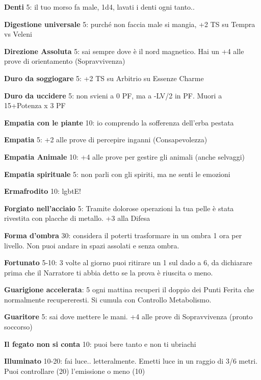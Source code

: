 \documentclass[a4paper,11pt,twoside,openany]{book}
\begin{document}
\textbf{Denti} 5: il tuo morso fa male, 1d4, lavati i denti ogni tanto..

\textbf{Digestione universale} 5: purché non faccia male si mangia, +2 TS su Tempra vs Veleni

\textbf{Direzione Assoluta} 5: sai sempre dove è il nord magnetico. Hai un +4 alle prove di orientamento (Sopravvivenza)

\textbf{Duro da soggiogare} 5: +2 TS su Arbitrio su Essenze Charme

\textbf{Duro da uccidere} 5: non svieni a 0 PF, ma a -LV/2 in PF. Muori a 15+Potenza x 3 PF

\textbf{Empatia con le piante} 10: io comprendo la sofferenza dell'erba pestata

\textbf{Empatia} 5: +2 alle prove di percepire inganni (Consapevolezza)

\textbf{Empatia Animale} 10: +4 alle prove per gestire gli animali (anche selvaggi)

\textbf{Empatia spirituale} 5: non parli con gli spiriti, ma ne senti le emozioni

\textbf{Ermafrodito} 10: lgbtE!

\textbf{Forgiato nell'acciaio} 5: Tramite dolorose operazioni la tua pelle è stata rivestita con placche di metallo. +3 alla Difesa

\textbf{Forma d'ombra} 30: considera il poterti trasformare in un ombra 1 ora per livello. Non puoi andare in spazi assolati e senza ombra.

\textbf{Fortunato} 5-10: 3 volte al giorno puoi ritirare un 1 sul dado a 6, da dichiarare prima che il Narratore ti abbia detto se la prova è riuscita o meno.

\textbf{Guarigione accelerata}: 5 ogni mattina recuperi il doppio dei Punti Ferita che normalmente recupereresti. Si cumula con Controllo Metabolismo. 

\textbf{Guaritore} 5: sai dove mettere le mani. +4 alle prove di Sopravvivenza (pronto soccorso)

\textbf{Il fegato non si conta} 10: puoi bere tanto e non ti ubriachi

\textbf{Illuminato} 10-20: fai luce.. letteralmente. Emetti luce in un raggio di 3/6 metri. Puoi controllare (20) l'emissione o meno (10)
\end{document}
